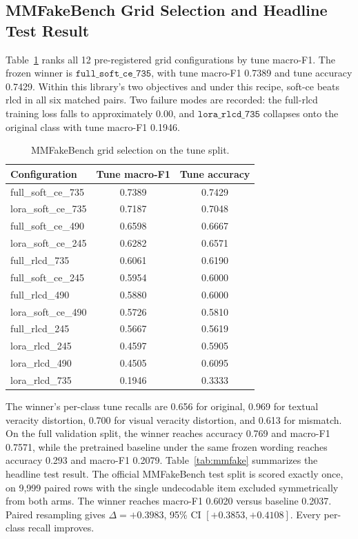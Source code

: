 \documentclass{article} %
\begin{document}
\subsection{MMFakeBench Grid Selection and Headline Test Result}
Table~\ref{tab:grid} ranks all 12 pre-registered grid configurations by tune macro-F1. The frozen winner is \( \texttt{full\_soft\_ce\_735} \), with tune macro-F1 0.7389 and tune accuracy 0.7429. Within this library's two objectives and under this recipe, soft-ce beats rlcd in all six matched pairs. Two failure modes are recorded: the full-rlcd training loss falls to approximately 0.00, and \( \texttt{lora\_rlcd\_735} \) collapses onto the original class with tune macro-F1 0.1946.

\begin{table}[t]
\centering
\small
\caption{MMFakeBench grid selection on the tune split.}
\label{tab:grid}
\begin{tabular}{lcc}
\toprule
Configuration & Tune macro-F1 & Tune accuracy \\
\midrule
full\_soft\_ce\_735 & 0.7389 & 0.7429 \\
lora\_soft\_ce\_735 & 0.7187 & 0.7048 \\
full\_soft\_ce\_490 & 0.6598 & 0.6667 \\
lora\_soft\_ce\_245 & 0.6282 & 0.6571 \\
full\_rlcd\_735 & 0.6061 & 0.6190 \\
full\_soft\_ce\_245 & 0.5954 & 0.6000 \\
full\_rlcd\_490 & 0.5880 & 0.6000 \\
lora\_soft\_ce\_490 & 0.5726 & 0.5810 \\
full\_rlcd\_245 & 0.5667 & 0.5619 \\
lora\_rlcd\_245 & 0.4597 & 0.5905 \\
lora\_rlcd\_490 & 0.4505 & 0.6095 \\
lora\_rlcd\_735 & 0.1946 & 0.3333 \\
\bottomrule
\end{tabular}
\end{table}

The winner's per-class tune recalls are 0.656 for original, 0.969 for textual veracity distortion, 0.700 for visual veracity distortion, and 0.613 for mismatch. On the full validation split, the winner reaches accuracy 0.769 and macro-F1 0.7571, while the pretrained baseline under the same frozen wording reaches accuracy 0.293 and macro-F1 0.2079. Table~\ref{tab:mmfake} summarizes the headline test result. The official MMFakeBench test split is scored exactly once, on 9,999 paired rows with the single undecodable item excluded symmetrically from both arms. The winner reaches macro-F1 0.6020 versus baseline 0.2037. Paired resampling gives \(\Delta=+0.3983\), 95\% CI \([+0.3853, +0.4108]\). Every per-class recall improves.
\end{document}
